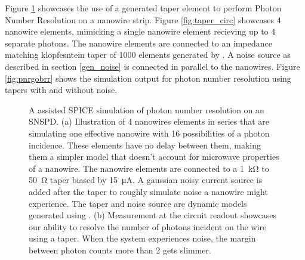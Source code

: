 Figure \ref{fig:taper_pnr} showcases the use of a  generated
taper element to perform Photon Number Resolution on a nanowire strip. 
Figure \ref{fig:taper_circ} showcases 4 nanowire elements, mimicking
a single nanowire element recieving up to 4 separate photons. The nanowire
elements are connected to an impedance matching klopfesntein taper of 1000
elements generated by . A noise source as described in section
\ref{gen_noise} is connected in parallel to the nanowires. Figure \ref{fig:pnrgobrr}
shows the simulation output for photon number resolution using tapers with 
and without noise.

\begin{figure}
    \centering
    \caption{A  assisted SPICE simulation of photon number resolution on an SNSPD.
    (a) Illustration of 4 nanowires elements in series that are simulating one 
    effective nanowire with 16
    possibilities of a photon incidence. These elements have no delay between them, making
    them a simpler model that doesn't account for microwave properties of a nanowire.
    The nanowire elements are connected to a \qty{1}{\kilo\ohm} to \qty{50}{\ohm} taper
    biased by \qty{15}{\micro\ampere}. A gaussian noisy current source is added after the taper to
    roughly simulate noise a nanowire might experience.
    The taper and noise source are dynamic models generated using .
    (b) Measurement at the circuit readout showcases our ability to resolve the number of
    photons incident on the wire using a taper. When the system experiences noise, the
    margin between photon counts more than 2 gets slimmer.}
    \label{fig:taper_pnr}
\end{figure}

